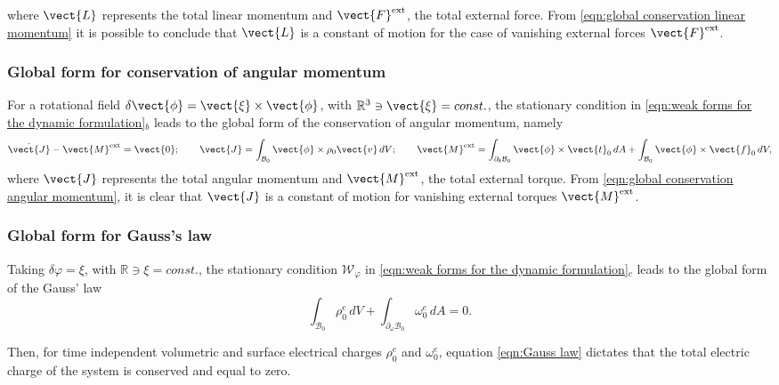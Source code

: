 where %
$\vect{L}$ represents the total linear momentum %
and $\vect{F}^{\text{ext}}$, the total external force.
From \eqref{eqn:global conservation linear momentum} it is possible to conclude that $\vect{L}$ is a constant of motion for the case of vanishing external forces $\vect{F}^{\text{ext}}$.

\subsubsection{Global form for conservation of angular momentum}\label{sec:conservation angular momentum global}

For a rotational field $\delta\vect{\phi} = \vect{\xi}\times\vect{\phi}$, with $\mathbb{R}^3\ni\vect{\xi}=const.$, the stationary condition in \eqref{eqn:weak forms for the dynamic formulation}$_b$ leads to the global form of the conservation of angular momentum, namely
%
\begin{equation}\label{eqn:global conservation angular momentum}
%
\dot{\vect{J}} - \vect{M}^{\text{ext}} = \vect{0};\qquad
%
\vect{J}= \int_{\mathcal{B}_0}\vect{\phi}\times\rho_0{\vect{v}}\,dV;\qquad
%
\vect{M}^{\text{ext}} =    
\int_{\partial_{\boldsymbol{t}}\mathcal{B}_0}\vect{\phi}\times\vect{t}_0\,dA
+\int_{\mathcal{B}_0}\vect{\phi}\times\vect{f}_0\,dV,
\end{equation}
%
where $\vect{J}$ represents the total angular momentum and $\vect{M}^{\text{ext}}$, the total external torque. 
From \eqref{eqn:global conservation angular momentum}, it is clear that $\vect{J}$ is a constant of motion for vanishing external torques $\vect{M}^{\text{ext}}$. 

\subsubsection{Global form for Gauss's law}\label{sec:Gauss law}

Taking $\delta\varphi = \xi$, with $\mathbb{R}\ni{\xi}=const.$, the stationary condition $\mathcal{W}_{\varphi}$ in \eqref{eqn:weak forms for the dynamic formulation}$_c$ leads to the global form of the Gauss' law
%
\begin{equation}\label{eqn:Gauss law}
\int_{\mathcal{B}_0}\rho^e_{0}\,dV + \int_{\partial_{\omega}\mathcal{B}_0}\omega^e_0\,dA=0.
\end{equation}
%

Then, for time independent volumetric and surface electrical charges $\rho^e_0$ and $\omega^e_0$, equation \eqref{eqn:Gauss law} dictates that the total electric charge of the system is conserved and equal to zero.

